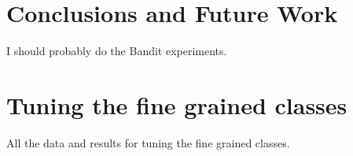 \documentclass[ms]{nuthesis}
\begin{document}
\chapter{Conclusions and Future Work}\label{chap:math}
\par I should probably do the Bandit experiments.










\backmatter

\appendix

\chapter{Tuning the fine grained classes}
\par All the data and results for tuning the fine grained classes.

%


\nocite{*}


\end{document}
